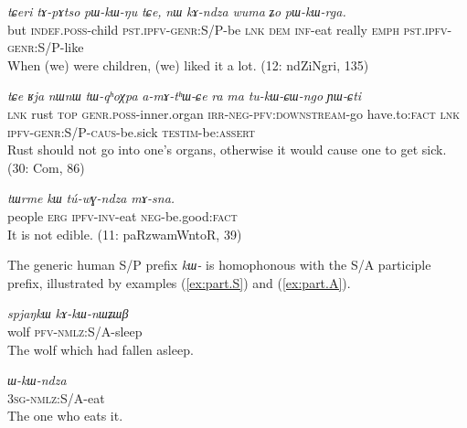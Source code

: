 \documentclass[oneside,a4paper,11pt]{article}
\newcommand{\ipa}[1]{\mbox{\phon\textit{#1}}} %
\begin{document}
\begin{exe}
\ex \label{ex:pWkWNu}
\gll
\ipa{tɕeri} 	\ipa{tɤ-pɤtso} 	\ipa{pɯ-kɯ-ŋu} 	\ipa{tɕe,} 	\ipa{nɯ} 	\ipa{kɤ-ndza} 	\ipa{wuma} 	\ipa{ʑo} 	\ipa{pɯ-kɯ-rga.} \\
but \textsc{indef.poss}-child \textsc{pst.ipfv-genr}:S/P-be \textsc{lnk} \textsc{dem} \textsc{inf}-eat really \textsc{emph} \textsc{pst.ipfv-genr}:S/P-like \\
\glt When (we) were children, (we) liked it a lot. (12: ndZiNgri, 135)
\end{exe}


\begin{exe}
\ex \label{ex:tukWCWngo}
\gll  \ipa{tɕe} 	\ipa{ʁja} 	\ipa{nɯnɯ} 	\ipa{tɯ-qʰoχpa} 	\ipa{a-mɤ-tʰɯ-ɕe} 	\ipa{ra} 	\ipa{ma} 	\ipa{tu-kɯ-ɕɯ-ngo} 	\ipa{ɲɯ-ɕti} \\
\textsc{lnk} rust \textsc{top} \textsc{genr.poss}-inner.organ \textsc{irr-neg-pfv:downstream}-go have.to:\textsc{fact} \textsc{lnk} \textsc{ipfv-genr:S/P-caus}-be.sick  \textsc{testim}-be:\textsc{assert} \\
\glt Rust should not go into one's organs, otherwise it would cause one to get sick. (30: Com, 86)
\end{exe}

\begin{exe}
\ex  \label{ex:genr.tWrme}
\gll
\ipa{tɯrme} 	\ipa{kɯ} 	\ipa{tú-wɣ-ndza} 	\ipa{mɤ-sna.} \\
people \textsc{erg} \textsc{ipfv-inv}-eat \textsc{neg}-be.good:\textsc{fact} \\
\glt It is not edible. (11: paRzwamWntoR, 39)
\end{exe}

The generic human S/P prefix \ipa{kɯ-} is homophonous with the S/A participle prefix, illustrated by examples (\ref{ex:part.S}) and (\ref{ex:part.A}).

\begin{exe}
\ex \label{ex:part.S}
\gll \ipa{spjaŋkɯ}	\ipa{kɤ-kɯ-nɯʑɯβ}	\\
wolf \textsc{pfv-nmlz}:S/A-sleep \\
\glt The wolf which had fallen asleep.
\end{exe}

\begin{exe}
\ex \label{ex:part.A}
\gll \ipa{ɯ-kɯ-ndza} \\
\textsc{3sg-nmlz}:S/A-eat \\
\glt The one who eats it.
\end{exe}
\end{document}
